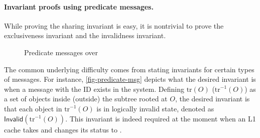 \paragraph{Invariant proofs using predicate messages.}

\newcommand{\subtree}[1]{\ensuremath{\textrm{tr}(#1)}}
\newcommand{\subtreec}[1]{\ensuremath{\textrm{tr}^{-1}(#1)}}
\newcommand{\objsinv}[1]{\ensuremath{\textsf{Invalid}(#1)}}

While proving the sharing invariant is easy, it is nontrivial to prove the exclusiveness invariant and the invalidness invariant.

\begin{figure}[h]
  \centering
  \caption{Predicate messages over }
  \label{fig-predicate-msg}
\end{figure}

The common underlying difficulty comes from stating invariants for certain types of messages.
For instance, \autoref{fig-predicate-msg} depicts what the desired invariant is when a message with the ID  exists in the system.
Defining $\subtree{O}$ ($\subtreec{O}$) as a set of objects inside (outside) the subtree rooted at $O$, the desired invariant is that each object in $\subtreec{O}$ is in logically invalid state, denoted as $\objsinv{\subtreec{O}}$.
This invariant is indeed required at the moment when an L1 cache takes  and changes its status to \stM{}.

